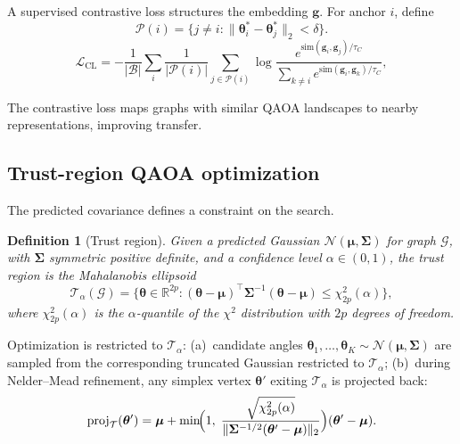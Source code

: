 \documentclass[aps,prx,reprint,superscriptaddress,longbibliography]{revtex4-2}
\newcommand{\QAOA}{\textnormal{\textsc{QAOA}}}
\newcommand{\Normal}{\mathcal{N}}
\newcommand{\calG}{\mathcal{G}}
\newcommand{\calL}{\mathcal{L}}
\newcommand{\calP}{\mathcal{P}}
\newcommand{\calB}{\mathcal{B}}
\newcommand{\calT}{\mathcal{T}}
\newcommand{\bbR}{\mathbb{R}}
\newtheorem{definition}{Definition}
\begin{document}
A supervised contrastive loss structures the embedding $\bm{g}$. For
anchor $i$, define
\begin{equation*}
    \calP(i)
    = \bigl\{j \ne i :
    \|\bm\theta_i^* - \bm\theta_j^*\|_2 < \delta\bigr\}.
\end{equation*}
\begin{equation}
    \calL_{\mathrm{CL}} = -\frac{1}{|\calB|}\sum_i
    \frac{1}{|\calP(i)|}\sum_{j \in \calP(i)}
    \log\frac{e^{\mathrm{sim}(\bm{g}_i,\bm{g}_j)/\tau_C}}
    {\sum_{k \ne i} e^{\mathrm{sim}(\bm{g}_i,\bm{g}_k)/\tau_C}},
    \label{eq:loss_cl}
\end{equation}

The contrastive loss maps graphs with similar \QAOA{} landscapes to
nearby representations, improving transfer.

\subsection{Trust-region \QAOA{} optimization}
\label{sec:trust_region}

The predicted covariance defines a constraint on the search.

\begin{definition}[Trust region]
\label{def:trust_region}
Given a predicted Gaussian $\Normal(\bm\mu,\bm\Sigma)$ for graph
$\calG$, with $\bm\Sigma$ symmetric positive definite, and a confidence
level $\alpha \in (0,1)$, the
\emph{trust region} is the Mahalanobis ellipsoid
\begin{equation}
    \calT_\alpha(\calG) = \bigl\{\bm\theta \in \bbR^{2p} :
    (\bm\theta - \bm\mu)^\top \bm\Sigma^{-1}
    (\bm\theta - \bm\mu) \le \chi^2_{2p}(\alpha)\bigr\},
    \label{eq:trust_region}
\end{equation}
where $\chi^2_{2p}(\alpha)$ is the $\alpha$-quantile of the
$\chi^2$ distribution with $2p$ degrees of freedom.
\end{definition}

Optimization is restricted to $\calT_\alpha$:
(a)~candidate angles
$\bm\theta_1,\ldots,\bm\theta_K \sim \Normal(\bm\mu,\bm\Sigma)$
are sampled from the corresponding truncated Gaussian restricted to
$\calT_\alpha$;
(b)~during Nelder--Mead refinement, any simplex vertex
$\bm\theta'$ exiting $\calT_\alpha$ is projected back:
\begin{equation}
    \mathrm{proj}_{\calT}(\bm\theta') = \bm\mu +
    \min\!\Bigl(1,\;
    \frac{\sqrt{\chi^2_{2p}(\alpha)}}
    {\|\bm\Sigma^{-1/2}(\bm\theta' - \bm\mu)\|_2}
    \Bigr)(\bm\theta' - \bm\mu).
    \label{eq:projection}
\end{equation}
\end{document}

